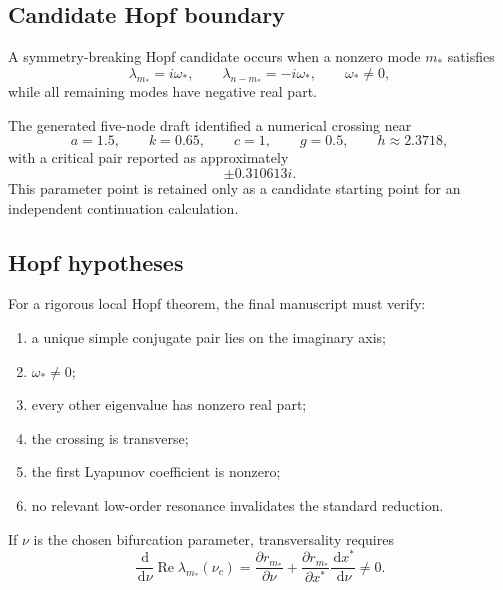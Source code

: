 \documentclass[11pt, reqno]{amsart}
\theoremstyle{definition}
\theoremstyle{remark}
\newcommand{\Ree}{\operatorname{Re}}
\newcommand{\dd}{\,\mathrm{d}}
\begin{document}
\subsection{Candidate Hopf boundary}

A symmetry-breaking Hopf candidate occurs when a nonzero mode $m_*$ satisfies
\begin{equation}
\label{eq:hopf-spectral}
    \lambda_{m_*}=i\omega_*,
    \qquad
    \lambda_{n-m_*}=-i\omega_*,
    \qquad
    \omega_*\ne0,
\end{equation}
while all remaining modes have negative real part.

The generated five-node draft identified a numerical crossing near
\[
    a=1.5,
    \qquad
    k=0.65,
    \qquad
    c=1,
    \qquad
    g=0.5,
    \qquad
    h\approx2.3718,
\]
with a critical pair reported as approximately
\[
    \pm0.310613i.
\]
This parameter point is retained only as a candidate starting point for an
independent continuation calculation.


\subsection{Hopf hypotheses}

For a rigorous local Hopf theorem, the final manuscript must verify:
\begin{enumerate}[label=(H\arabic*),leftmargin=3em]
    \item a unique simple conjugate pair lies on the imaginary axis;
    \item $\omega_*\ne0$;
    \item every other eigenvalue has nonzero real part;
    \item the crossing is transverse;
    \item the first Lyapunov coefficient is nonzero;
    \item no relevant low-order resonance invalidates the standard reduction.
\end{enumerate}

If $\nu$ is the chosen bifurcation parameter, transversality requires
\begin{equation}
\label{eq:transversality}
    \frac{\dd}{\dd\nu}\Ree\lambda_{m_*}(\nu_c)
    =
    \frac{\partial r_{m_*}}{\partial\nu}
    +
    \frac{\partial r_{m_*}}{\partial x^*}
    \frac{\dd x^*}{\dd\nu}
    \ne0.
\end{equation}
\end{document}
